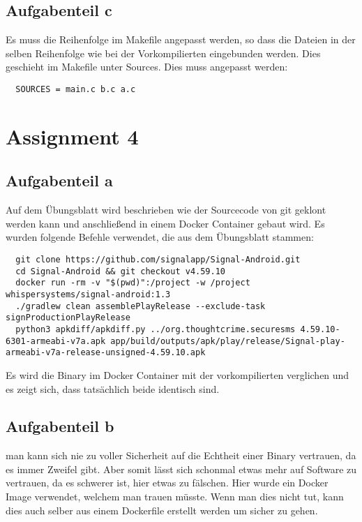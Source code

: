 \documentclass[a4paper,12pt,
headsepline,           %
twoside,               %
pointlessnumbers,      %
bibtotoc,              %
BCOR15mm               %
]{scrbook}
\begin{document}
\subsection*{Aufgabenteil c}
Es muss die Reihenfolge im Makefile angepasst werden, so dass die Dateien in der selben Reihenfolge wie bei der Vorkompilierten eingebunden werden. Dies geschieht im Makefile unter Sources. Dies muss angepasst werden:
\begin{lstlisting}
  SOURCES = main.c b.c a.c
\end{lstlisting}

\section*{Assignment 4}
\subsection*{Aufgabenteil a}
Auf dem Übungsblatt wird beschrieben wie der Sourcecode von git geklont werden kann und anschließend in einem Docker Container gebaut wird. Es wurden folgende Befehle verwendet, die aus dem Übungsblatt stammen:
\begin{lstlisting}
  git clone https://github.com/signalapp/Signal-Android.git
  cd Signal-Android && git checkout v4.59.10
  docker run -rm -v "$(pwd)":/project -w /project whispersystems/signal-android:1.3
  ./gradlew clean assemblePlayRelease --exclude-task signProductionPlayRelease
  python3 apkdiff/apkdiff.py ../org.thoughtcrime.securesms 4.59.10-6301-armeabi-v7a.apk app/build/outputs/apk/play/release/Signal-play-armeabi-v7a-release-unsigned-4.59.10.apk
\end{lstlisting}

Es wird die Binary im Docker Container mit der vorkompilierten verglichen und es zeigt sich, dass tatsächlich beide identisch sind.

\subsection*{Aufgabenteil b}
man kann sich nie zu voller Sicherheit auf die Echtheit einer Binary vertrauen, da es immer Zweifel gibt. Aber somit lässt sich schonmal etwas mehr auf Software zu vertrauen, da es schwerer ist, hier etwas zu fälschen. Hier wurde ein Docker Image verwendet, welchem man trauen müsste. Wenn man dies nicht tut, kann dies auch selber aus einem Dockerfile erstellt werden um sicher zu gehen.
\end{document}
